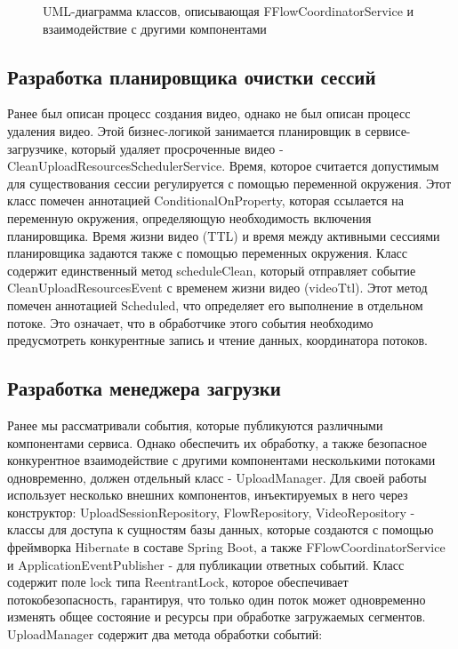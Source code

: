 	\begin{figure}[ht!] 
		\center
		\caption{UML-диаграмма классов, описывающая FFlowCoordinatorService и взаимодействие с другими компонентами} 
		\label{fig:uml_uploader_coordinator}  
	\end{figure}

	\subsection{Разработка планировщика очистки сессий}
	
	Ранее был описан процесс создания видео, однако не был описан процесс удаления видео. Этой бизнес-логикой занимается планировщик в сервисе-загрузчике, который удаляет просроченные видео - CleanUploadResourcesSchedulerService. Время, которое считается допустимым для существования сессии регулируется с помощью переменной окружения. Этот класс помечен аннотацией ConditionalOnProperty, которая ссылается на переменную окружения, определяющую необходимость включения планировщика. Время жизни видео (TTL) и время между активными сессиями планировщика задаются также с помощью переменных окружения. Класс содержит единственный метод scheduleClean, который отправляет событие CleanUploadResourcesEvent с временем жизни видео (videoTtl). Этот метод помечен аннотацией Scheduled, что определяет его выполнение в отдельном потоке. Это означает, что в обработчике этого события необходимо предусмотреть конкурентные запись и чтение данных, координатора потоков.
	
	\subsection{Разработка менеджера загрузки}
	
	Ранее мы рассматривали события, которые публикуются различными компонентами сервиса. Однако обеспечить их обработку, а также безопасное конкурентное взаимодействие с другими компонентами несколькими потоками одновременно, должен отдельный класс - UploadManager. Для своей работы использует несколько внешних компонентов, инъектируемых в него через конструктор: UploadSessionRepository, FlowRepository, VideoRepository - классы для доступа к сущностям базы данных, которые создаются с помощью фреймворка Hibernate в составе Spring Boot, а также FFlowCoordinatorService и ApplicationEventPublisher - для публикации ответных событий. Класс содержит поле lock типа ReentrantLock, которое обеспечивает потокобезопасность, гарантируя, что только один поток может одновременно изменять общее состояние и ресурсы при обработке загружаемых сегментов. UploadManager содержит два метода обработки событий:
	
